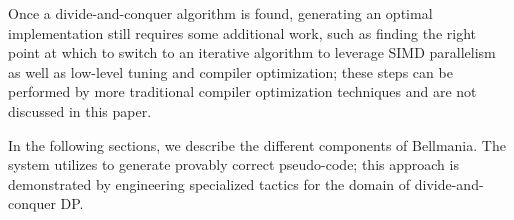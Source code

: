 Once a divide-and-conquer algorithm is found, generating an optimal implementation still requires some additional work, such as finding the right point at which to switch to an iterative algorithm to leverage SIMD parallelism as well as low-level tuning and compiler optimization;
these steps can be performed by more traditional compiler optimization techniques and are not discussed in this paper.

In the following sections, we describe the different components of Bellmania. 
The system utilizes  to generate provably correct pseudo-code; 
this approach is demonstrated by engineering specialized tactics for the domain of divide-and-conquer DP.

